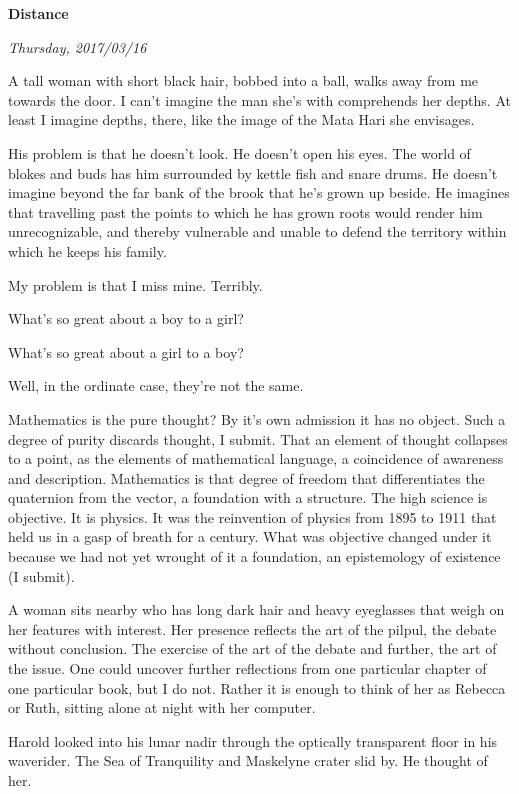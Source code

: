 

\centerline{\bf Distance}
\centerline{\it Thursday, 2017/03/16}



\break


A tall woman with short black hair, bobbed into a ball, walks away
from me towards the door.  I can't imagine the man she's with
comprehends her depths.  At least I imagine depths, there, like the
image of the Mata Hari she envisages.

His problem is that he doesn't look.  He doesn't open his eyes.  The
world of blokes and buds has him surrounded by kettle fish and snare
drums.  He doesn't imagine beyond the far bank of the brook that he's
grown up beside.  He imagines that travelling past the points to which
he has grown roots would render him unrecognizable, and thereby
vulnerable and unable to defend the territory within which he keeps
his family.

My problem is that I miss mine.  Terribly.


\break

What's so great about a boy to a girl?

What's so great about a girl to a boy?

Well, in the ordinate case, they're not the same.



\break


Mathematics is the pure thought?  By it's own admission it has no
object.  Such a degree of purity discards thought, I submit.  That an
element of thought collapses to a point, as the elements of
mathematical language, a coincidence of awareness and description.
Mathematics is that degree of freedom that differentiates the
quaternion from the vector, a foundation with a structure.  The high
science is objective.  It is physics.  It was the reinvention of
physics from 1895 to 1911 that held us in a gasp of breath for a
century.  What was objective changed under it because we had not yet
wrought of it a foundation, an epistemology of existence (I submit).


\break

A woman sits nearby who has long dark hair and heavy eyeglasses that
weigh on her features with interest.  Her presence reflects the art of
the pilpul, the debate without conclusion.  The exercise of the art of
the debate and further, the art of the issue.  One could uncover
further reflections from one particular chapter of one particular
book, but I do not.  Rather it is enough to think of her as Rebecca or
Ruth, sitting alone at night with her computer.


\break

Harold looked into his lunar nadir through the optically transparent
floor in his waverider.  The Sea of Tranquility and Maskelyne crater
slid by.  He thought of her.



\bye
